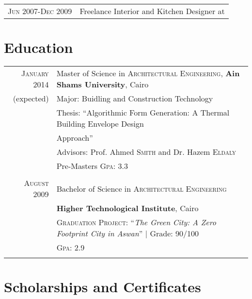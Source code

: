 \documentclass[a4paper,10pt]{article} %
\begin{document}
\begin{tabular}{r|p{11cm}}

\textsc{Jun 2007-Dec 2009} & Freelance Interior and Kitchen Designer at \emph{}\\
\end{tabular}


\section{Education}

\begin{tabular}{rl}	
\textsc{January} 2014 & Master of Science in \textsc{Architectural Engineering}, \textbf{Ain Shams University}, Cairo\\
(expected)& Major: Buidling and Construction Technology\\
& Thesis: ``Algorithmic Form Generation: A Thermal Building Envelope Design \\
& Approach'' \\
& \small Advisors: Prof. Ahmed \textsc{Smith} and Dr. Hazem \textsc{Eldaly}\\
&\normalsize Pre-Masters \textsc{Gpa}: 3.3\\
&\\


\textsc{August} 2009& Bachelor of Science in \textsc{Architectural Engineering} \\
& \normalsize\textbf{Higher Technological Institute}, Cairo\\
& \textsc{Graduation Project:} ``\emph{The Green City: A Zero Footprint City in Aswan}'' | \small Grade: 90/100\\
&\normalsize \textsc{Gpa}: 2.9 \\
&\\

\end{tabular}


\section{Scholarships and Certificates}
\end{document}
